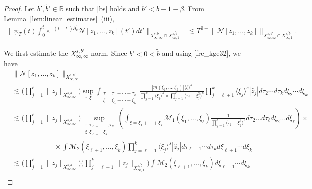 \documentclass[a4paper,
11pt,  reqno]{amsart}
\newcommand{\jap}[1]{\langle #1 \rangle}
\newcommand{\5}{\textup{V}}
\newcommand{\ft}{\widehat}
\newcommand{\les}{\lesssim}
\newcommand{\wt}{\widetilde}
\theoremstyle{remark}
\newcommand{\R}{\mathbb{R}}
\newcommand{\be}{\beta}
\renewcommand{\l}{\ell}
\numberwithin{equation}{section}
\numberwithin{theorem}{section}
\newcommand{\Ncal}{\mathcal{N}}
\begin{document}
		\begin{proof}

        Let $b', \wt b' \in \R$ such that \eqref{bs} holds
        {and $\wt b' < b - 1 - \be$.}
        From Lemma~\ref{lem:linear_estimates}~(iii),
        \begin{align}
            \bigg\|\psi_T (t)\int_0^t e^{-(t-t')\partial_x^3}\Ncal[z_1,\ldots, z_k](t')dt' \bigg\|_{X^{s,b}_{\infty, \infty} \cap X^{s, \wt b}_{\infty, 1}}
            &
            \les T^{0+} \| \Ncal[z_1, \ldots, z_k] \|_{X^{s, b'}_{\infty, \infty} \cap X^{s, \wt b '}_{\infty, 1} } .
        \end{align}


        We first estimate the $X^{s, b'}_{\infty, \infty}$-norm. Since $b'<0<\wt b$ and using \eqref{fre_kge32}, we have
\begin{align*}
				&\|\Ncal[z_1,\dots, z_k] \|_{X^{s,b'}_{\infty, \infty}}
                \\
                & \les
                \bigg(\prod_{j=1}^\ell \|z_j\|_{X_{\infty,\infty}^{s,b}}
                \bigg)
                \sup_{\tau, \xi} \int_{\substack{\tau=\tau_1 + \cdots + \tau_k \\ \xi = \xi_1 + \cdots + \xi_k}} \frac{|m(\xi_1, \ldots, \xi_k)|\jap{\xi}^s}{\prod_{j=1}^k\jap{\xi_j}^s \times \prod_{j=1}^\ell \jap{\tau_j-\xi_j^3}^b}\prod_{j=\ell+1}^k \jap{\xi_j}^s|\ft{z}_j| d\tau_2\cdots d\tau_k d\xi_2 \cdots d\xi_k
				\\
                &\les
                \bigg(\prod_{j=1}^\ell \|z_j\|_{X_{\infty,\infty}^{s,b}}
                \bigg)
                \sup_{\substack{\tau, \tau_{\ell+1},\dots,\tau_k\\ \xi, \xi_{\ell+1}, \xi_k}} \left(\int_{\xi=\xi_1+\cdots+\xi_k} \mathcal{M}_1(\xi_1, \ldots, \xi_\l) \frac{1}{\prod_{j=1}^\ell \jap{\tau_j-\xi_j^3}^b}d\tau_2\dots d\tau_\ell d\xi_2\dots d\xi_\ell\right) \times
                \\ & \qquad \qquad \qquad \times \int \mathcal{M}_2(\xi_{\l+1}, \ldots, \xi_k) \prod_{j=\ell+1}^k \jap{\xi_j}^s|\ft{z}_j| d\tau_{\ell+1}\cdots d\tau_k d\xi_{\ell+1} \cdots d\xi_k
				\\
                &
                \les
                \bigg(\prod_{j=1}^\ell \|z_j\|_{X_{\infty,\infty}^{s,b}}
                \bigg)
                \bigg( \prod_{j=\l+1}^k \|z_j\|_{X^{s, \wt b}_{\infty, 1}} \bigg)
                \int  \mathcal{M}_2 (\xi_{\l+1}, \ldots, \xi_k)
                d\xi_{\l+1} \cdots d\xi_{k}
				\\

\end{align*}
\end{proof}
\end{document}
